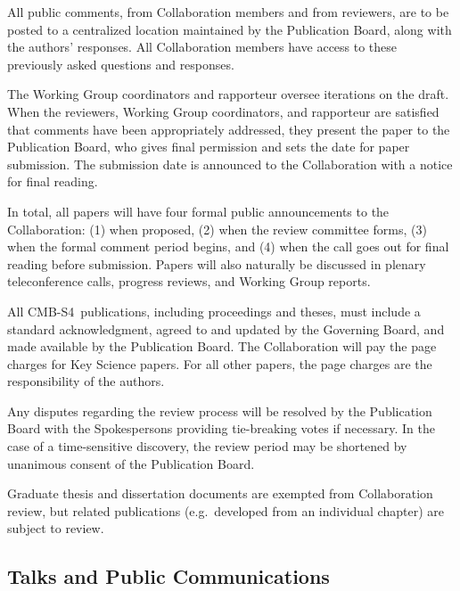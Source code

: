 \documentclass[12pt]{article}
\newcommand\collabname{CMB-S4}
\begin{document}
All public comments, from Collaboration members and from reviewers, are to be posted to a centralized location maintained by the Publication Board, along with the authors' responses. All Collaboration members have access to these previously asked questions and responses.

The Working Group coordinators and rapporteur oversee iterations on the draft.  When the reviewers, Working Group coordinators, and rapporteur are satisfied that comments have been appropriately addressed, they present the paper to the Publication Board, who gives final permission and sets the date for paper submission.  The submission date is announced to the Collaboration with a notice for final reading.  

In total, all papers will have four formal public announcements to the Collaboration: (1) when proposed, (2) when the review committee forms, (3) when the formal comment period begins, and (4) when the call goes out for final reading before submission. Papers will also naturally be discussed in plenary teleconference calls, progress reviews, and Working Group reports.

All \collabname\ publications, including proceedings and theses, must include a standard acknowledgment, agreed to and updated by the Governing Board, and made available by the Publication Board. The Collaboration will pay the page charges for Key Science papers. For all other papers, the page charges are the responsibility of the authors.

Any disputes regarding the review process will be resolved by the Publication Board with the Spokespersons providing tie-breaking votes if necessary. In the case of a time-sensitive discovery, the review period may be shortened by unanimous consent of the Publication Board.

Graduate thesis and dissertation documents are exempted from Collaboration review, but related publications (e.g.~developed from an individual chapter) are subject to review.

\subsection{Talks and Public Communications}
\end{document}
